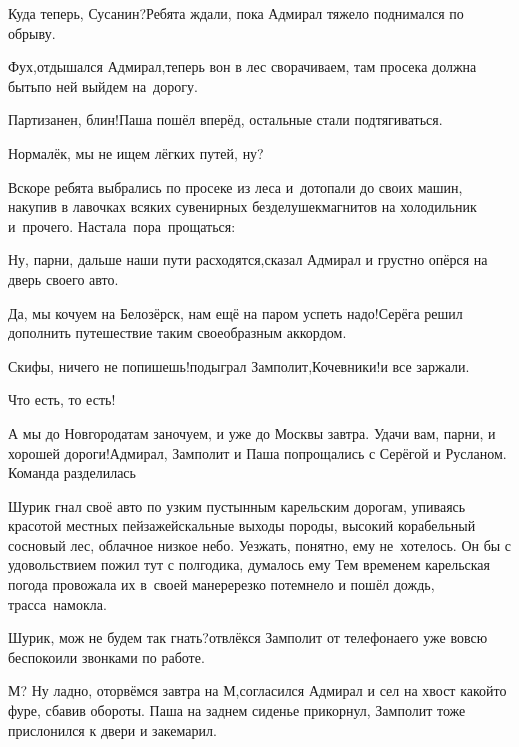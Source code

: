\diagdash Куда теперь, Сусанин?\mdash Ребята ждали, пока Адмирал тяжело поднимался по обрыву.

\diagdash Фух,\mdash отдышался Адмирал,\mdash теперь вон в лес сворачиваем, там просека должна быть\mdash по ней выйдем на~дорогу.

\diagdash Партизанен, блин!\mdash Паша пошёл вперёд, остальные стали подтягиваться.

\diagdash Нормалёк, мы не ищем лёгких путей, ну?


Вскоре ребята выбрались по просеке из леса и~дотопали до своих машин, накупив в лавочках всяких сувенирных безделушек\mdash магнитов на холодильник и~прочего. Настала~пора~прощаться:

\diagdash Ну, парни, дальше наши пути расходятся,\mdash сказал Адмирал и грустно опёрся на дверь своего авто.

\diagdash Да, мы кочуем на Белозёрск, нам ещё на паром успеть надо!\mdash Серёга решил дополнить путешествие таким своеобразным аккордом.

\diagdash Скифы, ничего не попишешь!\mdash подыграл Замполит,\mdash Кочевники!\mdash и все заржали.

\diagdash Что есть, то есть! 

\diagdash А мы до Новгорода\mdash там заночуем, и уже до Москвы завтра. Удачи вам, парни, и хорошей дороги!\mdash Адмирал, Замполит и Паша попрощались с Серёгой и Русланом. Команда разделилась\myldots{}


\myldots{}Шурик гнал своё авто по узким пустынным карельским дорогам, упиваясь красотой местных пейзажей\mdash скальные выходы породы, высокий корабельный сосновый лес, облачное низкое небо. Уезжать, понятно, ему не~хотелось. Он бы с удовольствием пожил тут с полгодика, думалось ему\myldots{} Тем временем карельская погода провожала их в~своей манере\mdash резко потемнело и пошёл дождь, трасса~намокла.

{
\diagdash Шурик, мож не будем так гнать?\mdash отвлёкся Замполит от телефона\mdash его уже вовсю беспокоили звонками по работе.

\diagdash М? Ну ладно, оторвёмся завтра на М,\mdash согласился Адмирал и сел на хвост какой\sdash то фуре, сбавив обороты. Паша на заднем сиденье прикорнул, Замполит тоже прислонился к двери и закемарил.
}

